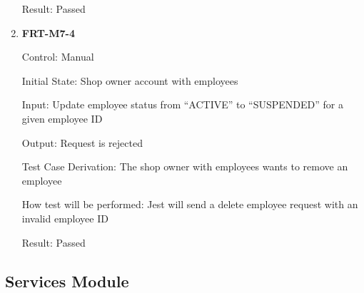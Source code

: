 \documentclass[12pt, titlepage]{article}
\begin{document}
\begin{enumerate}
	      Result: Passed

	\item \textbf{FRT-M7-4}

	      Control: Manual

	      Initial State: Shop owner account with employees

	      Input: Update employee status from ``ACTIVE'' to ``SUSPENDED'' for a given employee ID

	      Output: Request is rejected

	      Test Case Derivation: The shop owner with employees wants to remove an employee

	      How test will be performed: Jest will send a delete employee request with an invalid employee ID

	      Result: Passed

\end{enumerate}

\subsection{Services Module}
\end{document}
